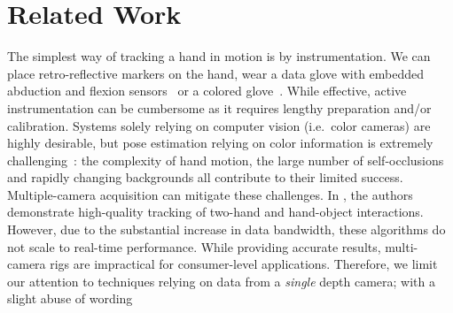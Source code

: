 



\section{Related Work}
\label{sec:related}

The simplest way of tracking a hand in motion is by instrumentation. We can place retro-reflective markers on the hand, wear a data glove with embedded abduction and flexion sensors~\cite{dipietro2008survey} or a colored glove~\cite{wang2009colorglove}. While effective, active instrumentation can be cumbersome as it requires lengthy preparation and/or calibration.
Systems solely relying on computer vision (i.e.\ color cameras) are highly desirable, but pose estimation  relying on color information is extremely challenging~\cite{erol2007vision}: the complexity of hand motion, the large number of self-occlusions and rapidly changing backgrounds all contribute to their limited success. Multiple-camera acquisition can mitigate these challenges. In \cite{ballan2013salient}, the authors demonstrate high-quality tracking of two-hand and hand-object interactions. 
However, due to the substantial increase in data bandwidth, these algorithms do not scale to real-time performance. While providing accurate results, multi-camera rigs are  impractical for consumer-level applications. Therefore, we limit our attention to techniques relying on data from a \emph{single} depth camera; with a slight abuse of wording 

